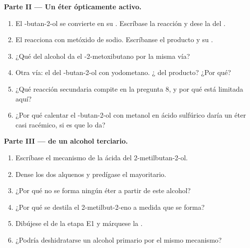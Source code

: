 \begin{problem}
\medskip
\noindent\textbf{Parte II --- Un éter ópticamente activo.}
\begin{enumerate}[resume]
  \item El -butan-2-ol se convierte en su . Escríbase la
        reacción y dese la  del .
  \item El  reacciona con metóxido de sodio. Escríbanse el
        producto y su .
  \item ¿Qué  del alcohol da el -2-metoxibutano por la
        misma vía?
  \item Otra vía: el  del -butan-2-ol con yodometano.
        ¿ del producto? ¿Por qué?
  \item ¿Qué reacción secundaria compite en la pregunta 8, y por qué está
        limitada aquí?
  \item ¿Por qué calentar el -butan-2-ol con metanol en ácido
        sulfúrico daría un éter casi racémico, si es que lo da?
\end{enumerate}

\medskip
\noindent\textbf{Parte III ---  de un alcohol terciario.}
\begin{enumerate}[resume]
  \item Escríbase el mecanismo de la  ácida del
        2-metilbutan-2-ol.
  \item Dense los dos alquenos y predígase el mayoritario.
  \item ¿Por qué no se forma ningún éter a partir de este alcohol?
  \item ¿Por qué se destila el 2-metilbut-2-eno a medida que se forma?
  \item Dibújese el  de la etapa E1 y márquese la .
  \item ¿Podría deshidratarse un alcohol primario por el mismo mecanismo?
\end{enumerate}


\end{problem}
